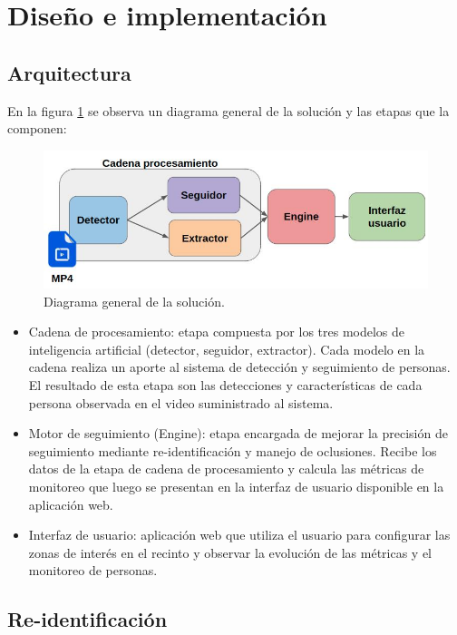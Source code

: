 \documentclass[conference]{IEEEtran}
\begin{document}
\section{Diseño e implementación}

\subsection{Arquitectura}

En la figura \ref{fig:esquemaGeneral} se observa un diagrama general de la solución y las etapas que la componen:

\begin{figure}[htbp]
\centerline{\includegraphics[scale=.4]{./Figures/esquemaGeneral.jpg}}
\caption{Diagrama general de la solución.}
\label{fig:esquemaGeneral}
\end{figure}

\begin{itemize}
\item Cadena de procesamiento: etapa compuesta por los tres modelos de inteligencia artificial (detector, seguidor, extractor). Cada modelo en la cadena realiza un aporte al sistema de detección y seguimiento de personas. El resultado de esta etapa son las detecciones y características de cada persona observada en el video suministrado al sistema.
\item Motor de seguimiento (Engine): etapa encargada de mejorar la precisión de seguimiento mediante re-identificación y manejo de oclusiones. Recibe los datos de la etapa de cadena de procesamiento y calcula las métricas de monitoreo que luego se presentan en la interfaz de usuario disponible en la aplicación web.
\item Interfaz de usuario: aplicación web que utiliza el usuario para configurar las zonas de interés en el recinto y observar la evolución de las métricas y el monitoreo de personas.
\end{itemize}

\subsection{Re-identificación}
\label{seccionreid}
\end{document}
